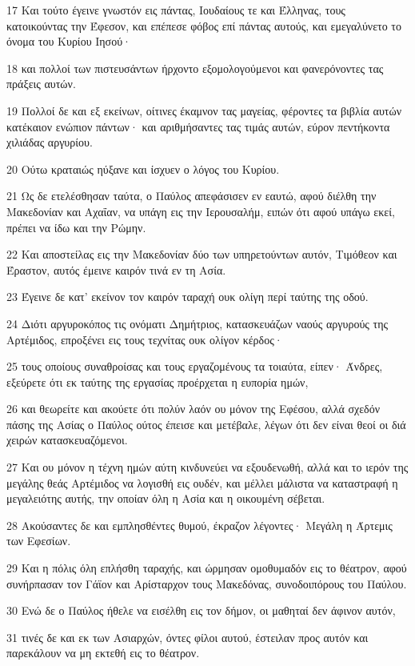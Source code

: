 \par 17 Και τούτο έγεινε γνωστόν εις πάντας, Ιουδαίους τε και Έλληνας, τους κατοικούντας την Έφεσον, και επέπεσε φόβος επί πάντας αυτούς, και εμεγαλύνετο το όνομα του Κυρίου Ιησού·
\par 18 και πολλοί των πιστευσάντων ήρχοντο εξομολογούμενοι και φανερόνοντες τας πράξεις αυτών.
\par 19 Πολλοί δε και εξ εκείνων, οίτινες έκαμνον τας μαγείας, φέροντες τα βιβλία αυτών κατέκαιον ενώπιον πάντων· και αριθμήσαντες τας τιμάς αυτών, εύρον πεντήκοντα χιλιάδας αργυρίου.
\par 20 Ούτω κραταιώς ηύξανε και ίσχυεν ο λόγος του Κυρίου.
\par 21 Ως δε ετελέσθησαν ταύτα, ο Παύλος απεφάσισεν εν εαυτώ, αφού διέλθη την Μακεδονίαν και Αχαΐαν, να υπάγη εις την Ιερουσαλήμ, ειπών ότι αφού υπάγω εκεί, πρέπει να ίδω και την Ρώμην.
\par 22 Και αποστείλας εις την Μακεδονίαν δύο των υπηρετούντων αυτόν, Τιμόθεον και Έραστον, αυτός έμεινε καιρόν τινά εν τη Ασία.
\par 23 Έγεινε δε κατ' εκείνον τον καιρόν ταραχή ουκ ολίγη περί ταύτης της οδού.
\par 24 Διότι αργυροκόπος τις ονόματι Δημήτριος, κατασκευάζων ναούς αργυρούς της Αρτέμιδος, επροξένει εις τους τεχνίτας ουκ ολίγον κέρδος·
\par 25 τους οποίους συναθροίσας και τους εργαζομένους τα τοιαύτα, είπεν· Άνδρες, εξεύρετε ότι εκ ταύτης της εργασίας προέρχεται η ευπορία ημών,
\par 26 και θεωρείτε και ακούετε ότι πολύν λαόν ου μόνον της Εφέσου, αλλά σχεδόν πάσης της Ασίας ο Παύλος ούτος έπεισε και μετέβαλε, λέγων ότι δεν είναι θεοί οι διά χειρών κατασκευαζόμενοι.
\par 27 Και ου μόνον η τέχνη ημών αύτη κινδυνεύει να εξουδενωθή, αλλά και το ιερόν της μεγάλης θεάς Αρτέμιδος να λογισθή εις ουδέν, και μέλλει μάλιστα να καταστραφή η μεγαλειότης αυτής, την οποίαν όλη η Ασία και η οικουμένη σέβεται.
\par 28 Ακούσαντες δε και εμπλησθέντες θυμού, έκραζον λέγοντες· Μεγάλη η Άρτεμις των Εφεσίων.
\par 29 Και η πόλις όλη επλήσθη ταραχής, και ώρμησαν ομοθυμαδόν εις το θέατρον, αφού συνήρπασαν τον Γάϊον και Αρίσταρχον τους Μακεδόνας, συνοδοιπόρους του Παύλου.
\par 30 Ενώ δε ο Παύλος ήθελε να εισέλθη εις τον δήμον, οι μαθηταί δεν άφινον αυτόν,
\par 31 τινές δε και εκ των Ασιαρχών, όντες φίλοι αυτού, έστειλαν προς αυτόν και παρεκάλουν να μη εκτεθή εις το θέατρον.
